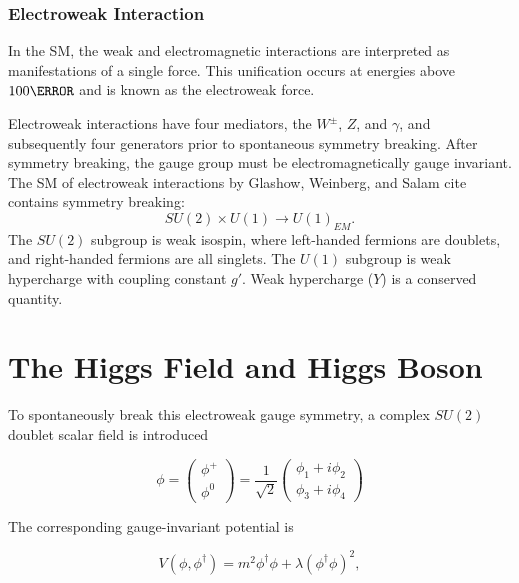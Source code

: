         \subsubsection{Electroweak Interaction}

        In the \gls{SM}, the weak and electromagnetic interactions are interpreted as manifestations of a single force. This unification occurs at energies above $\unit{100}{\GeV}$ and is known as the electroweak force.

        Electroweak interactions have four mediators, the $W^{\pm}$, $Z$, and $\gamma$, and subsequently four generators prior to spontaneous symmetry breaking. After symmetry breaking, the gauge group must be electromagnetically gauge invariant. The \gls{SM} of electroweak interactions by Glashow, Weinberg, and Salam {\color{red} cite} contains symmetry breaking:
        \begin{equation}
            SU(2) \times U(1) \rightarrow U(1)_{EM}.
        \end{equation}
        The $SU(2)$ subgroup is weak isospin, where left-handed fermions are doublets, and right-handed fermions are all singlets. The $U(1)$ subgroup is weak hypercharge with coupling constant $g'$. Weak hypercharge ($Y$) is a conserved quantity. 

\section{The Higgs Field and Higgs Boson}

To spontaneously break this electroweak gauge symmetry, a complex $SU(2)$ doublet scalar field is introduced

\begin{equation}
\phi = \begin{pmatrix} \phi^+ \\ \phi^0 \end{pmatrix}
    = \frac{1}{\sqrt{2}}\begin{pmatrix}
        \phi_1 + i\phi_2 \\ \phi_3 + i\phi_4
    \end{pmatrix}
\end{equation}

The corresponding gauge-invariant potential is 

\begin{equation}
    V(\phi,\phi^\dagger) = m^2 \phi^\dagger \phi + \lambda (\phi^\dagger \phi)^2,
\end{equation}

